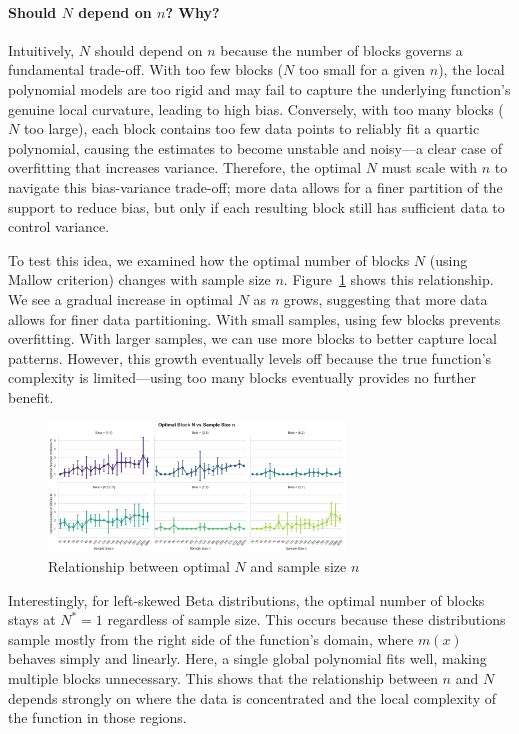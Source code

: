 \documentclass{article}
\begin{document}
\paragraph{Should $N$ depend on $n$? Why?}
Intuitively, $N$ should depend on $n$ because the number of blocks governs a fundamental 
trade-off. With too few blocks ($N$ too small for a given $n$), the local polynomial models 
are too rigid and may fail to capture the underlying function's genuine local curvature, 
leading to high bias. Conversely, with too many blocks ($N$ too large), each block contains 
too few data points to reliably fit a quartic polynomial, causing the estimates to become 
unstable and noisy—a clear case of overfitting that increases variance. Therefore, the 
optimal $N$ must scale with $n$ to navigate this bias-variance trade-off; more data allows 
for a finer partition of the support to reduce bias, but only if each resulting block still 
has sufficient data to control variance.

To test this idea, we examined how the optimal number of blocks $N$ (using Mallow criterion) changes with sample size $n$.
Figure~\ref{fig:Nvsn} shows this relationship. We see a gradual increase in optimal $N$ as $n$ 
grows, suggesting that more data allows for finer data partitioning. With small samples, using 
few blocks prevents overfitting. With larger samples, we can use more blocks to better capture 
local patterns. However, this growth eventually levels off because the true function's 
complexity is limited—using too many blocks eventually provides no further benefit.

\begin{figure}[H]
\centering
\includegraphics[width=0.7\textwidth]{plot4_block_vs_n.png}
\caption{Relationship between optimal $N$ and sample size $n$}
\label{fig:Nvsn}
\end{figure}

Interestingly, for left-skewed Beta distributions, the optimal number of blocks stays at 
$N^* = 1$ regardless of sample size. This occurs because these distributions sample mostly 
from the right side of the function's domain, where $m(x)$ behaves simply and linearly. 
Here, a single global polynomial fits well, making multiple blocks unnecessary. This shows 
that the relationship between $n$ and $N$ depends strongly on where the data is concentrated 
and the local complexity of the function in those regions.
\end{document}
